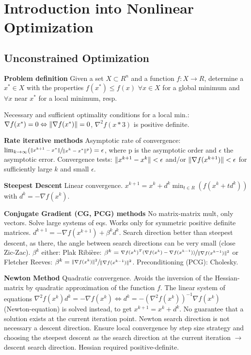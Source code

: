 \section*{Introduction into Nonlinear Optimization}

\subsection*{Unconstrained Optimization}

\textbf{Problem definition}
Given a set $X\subset R^n$ and a function $f: X \rightarrow R$, determine a $x^* \in X$ with the properties $f(x^*) \leq f(x)$ $\forall x \in X$ for a global minimum and $\forall x$ near $x^*$ for a local minimum, resp.

Necessary and sufficient optimality conditions for a local min.: $\nabla f (x^*) = 0 \Leftrightarrow \lVert \nabla f(x^*) \rVert = 0$, $\nabla^2 f(x*3)$ is positive definite.

\textbf{Rate iterative methods}
Asymptotic rate of convergence: $\lim_{k\to\infty} (\sfrac{\lVert x^{k+1} - x^* \rVert}{\lVert x^k - x^* \rVert^p}) = \epsilon$, where p is the asymptotic order and $\epsilon$ the asymptotic error.
Convergence tests: $\lVert x^{k+1}-x^k \rVert<\epsilon$ and/or $\lVert \nabla f(x^{k+1}) \rVert<\epsilon$ for sufficiently large $k$ and small $\epsilon$.

\textbf{Steepest Descent}
Linear convergence. $x^{k+1} = x^{k} + d^k \min_{t \in R}(f(x^k + t d^k))$ with $d^k = -\nabla f(x^k)$.

\textbf{Conjugate Gradient (CG, PCG) methods}
No matrix-matrix mult, only vectors. Solve large systems of eqs. Works only for symmetric positive definite matrices.
$d^{k+1} = -\nabla f(x^{k+1}) + \beta^k d^k$. Search direction better than steepest descent, as there, the angle between search directions can be very small (close Zic-Zac). 
$\beta^k$ either: Plak Ribière: $\beta^k= \sfrac{\nabla f (x^k)^T (\nabla f(x^k) - \nabla f(x^{k-1}))}{\lVert \nabla f (x^{k-1}) \rVert^2}$ or Fletcher Reeves: $\beta^k= \sfrac{\lVert \nabla f(x^k) \rVert^2}{\lVert \nabla f (x^{k-1}) \rVert^2}$.
Preconditioning (PCG): Cholesky. %

\textbf{Newton Method}
Quadratic convergence. 
Avoids the inversion of the Hessian-matrix by quadratic approximation of the function $f$. The linear system of equations $\nabla^2 f(x^k) d^{k} = -\nabla f(x^k) \Leftrightarrow d^k = - (\nabla^2 f(x^{k}))^{-1} \nabla f(x^k)$ (Newton-equation) is solved instead, to get $x^{k+1}=x^k + d^k$.
No guarantee that a solution exists at the current iteration point. Newton search direction is not necessary a descent direction.
Ensure local convergence by step size strategy and choosing the steepest descent as the search direction at the current iteration $\rightarrow$ descent search direction.
Hessian required positive-definite.

